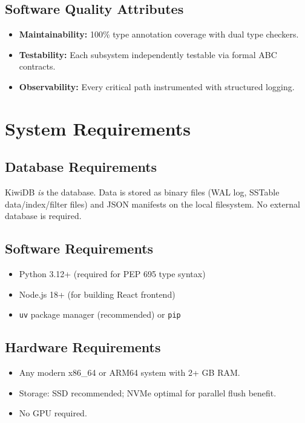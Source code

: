 \documentclass[oneside,a4paper,12pt]{book}
\begin{document}
\subsection{Software Quality Attributes}
\begin{itemize}[leftmargin=2em]
    \item \textbf{Maintainability:} 100\% type annotation coverage with dual type checkers.
    \item \textbf{Testability:} Each subsystem independently testable via formal ABC contracts.
    \item \textbf{Observability:} Every critical path instrumented with structured logging.
\end{itemize}

\section{System Requirements}

\subsection{Database Requirements}
KiwiDB \emph{is} the database. Data is stored as binary files (WAL log, SSTable data/index/filter files) and JSON manifests on the local filesystem. No external database is required.

\subsection{Software Requirements}
\begin{itemize}[leftmargin=2em]
    \item Python 3.12+ (required for PEP 695 type syntax)
    \item Node.js 18+ (for building React frontend)
    \item \texttt{uv} package manager (recommended) or \texttt{pip}
\end{itemize}

\subsection{Hardware Requirements}
\begin{itemize}[leftmargin=2em]
    \item Any modern x86\_64 or ARM64 system with 2+ GB RAM.
    \item Storage: SSD recommended; NVMe optimal for parallel flush benefit.
    \item No GPU required.
\end{itemize}
\end{document}
